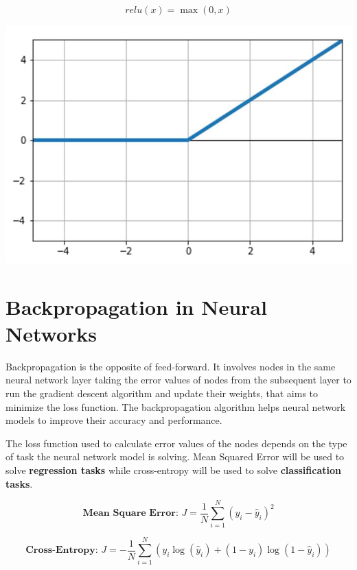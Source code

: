 \documentclass[12pt]{article}
\begin{document}
\begin{center}
\begin{minipage}[c]{0.45\textwidth}
\[
\textit{relu}(x) = \max(0, x)
\]
\end{minipage}
\begin{minipage}[c]{0.40\textwidth}
\centering
\includegraphics[width=\linewidth]{images/lecture_04/img_7.png}
\end{minipage}
\end{center}

\newpage
\section{Backpropagation in Neural Networks}
Backpropagation is the opposite of feed-forward. It involves nodes in the same neural network layer taking the error values of nodes from the subsequent layer to run the gradient descent algorithm and update their weights, that aims to minimize the loss function. The backpropagation algorithm helps neural network models to improve their accuracy and performance.
\vspace{1.5em}

The loss function used to calculate error values of the nodes depends on the type of task the neural network model is solving. Mean Squared Error will be used to solve \textbf{regression tasks} while cross-entropy will be used to solve \textbf{classification tasks}.
\vspace{1.0em}

\[
\textbf{Mean Square Error: } J = \frac{1}{N} \sum_{i=1}^{N} (y_i - \hat{y}_i)^2
\]

\[
\textbf{Cross-Entropy: } J = -\frac{1}{N} \sum_{i=1}^{N} \left( y_i \log(\hat{y}_i) + (1 - y_i)\log(1 - \hat{y}_i) \right)
\]
\end{document}
